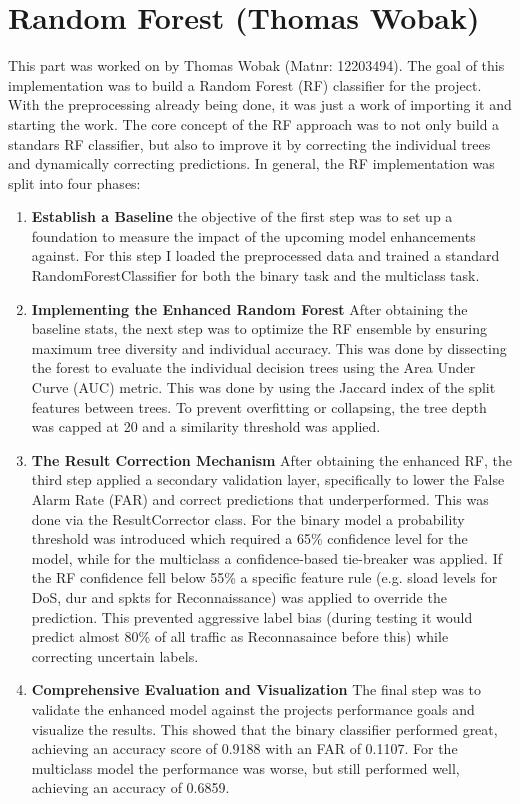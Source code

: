 \section{Random Forest (Thomas Wobak)}
This part was worked on by Thomas Wobak (Matnr: 12203494).
The goal of this implementation was to build a Random Forest (RF) classifier for the project. With the preprocessing already being done, it was just a work of importing it and starting the work.
\nextparagraph
The core concept of the RF approach was to not only build a standars RF classifier, but also to improve it by correcting the individual trees and dynamically correcting predictions. In general, the RF implementation was split into four phases:
\nextparagraph
\begin{enumerate}
    \item \textbf{Establish a Baseline} the objective of the first step was to set up a foundation to measure the impact of the upcoming model enhancements against. For this step I loaded the preprocessed data and trained a standard RandomForestClassifier for both the binary task and the multiclass task.
    \item \textbf{Implementing the Enhanced Random Forest} After obtaining the baseline stats, the next step was to optimize the RF ensemble by ensuring maximum tree diversity and individual accuracy. This was done by dissecting the forest to evaluate the individual decision trees using the Area Under Curve (AUC) metric. This was done by using the Jaccard index of the split features between trees. To prevent overfitting or collapsing, the tree depth was capped at 20 and a similarity threshold was applied.
    \item \textbf{The Result Correction Mechanism} After obtaining the enhanced RF, the third step applied a secondary validation layer, specifically to lower the False Alarm Rate (FAR) and correct predictions that underperformed. This was done via the ResultCorrector class. For the binary model a probability threshold was introduced which required a 65\% confidence level for the model, while for the multiclass a confidence-based tie-breaker was applied. If the RF confidence fell below 55\% a specific feature rule (e.g. sload levels for DoS, dur and spkts for Reconnaissance) was applied to override the prediction. This prevented aggressive label bias (during testing it would predict almost 80\% of all traffic as Reconnasaince before this) while correcting uncertain labels.
    \item \textbf{Comprehensive Evaluation and Visualization} The final step was to validate the enhanced model against the projects performance goals and visualize the results. This showed that the binary classifier performed great, achieving an accuracy score of 0.9188 with an FAR of 0.1107. For the multiclass model the performance was worse, but still performed well, achieving an accuracy of 0.6859.
\end{enumerate}
